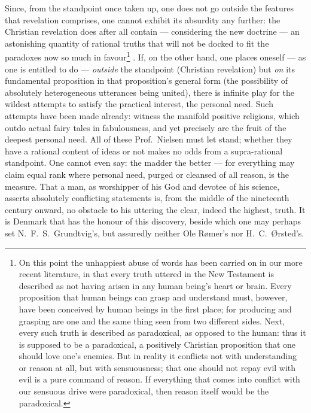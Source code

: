 \documentclass[12pt,a4paper]{book}
\renewcommand{\thefootnote}{*)}
\newcommand{\fnmark}[2]{\renewcommand{\thefootnote}{#1}\footnote{#2}%
  \renewcommand{\thefootnote}{*)}}
\newcommand{\opage}[1]{\marginnote{\footnotesize\textit{[#1]}}}
\begin{document}
Since, from the standpoint once taken up, one does not go outside the features
that revelation comprises,
\opage{35}one cannot exhibit its absurdity any further: the Christian
revelation does after all contain --- considering the new doctrine --- an
astonishing quantity of rational truths that will not be docked to fit the
paradoxes now so much in favour\fnmark{*)}{On this point the unhappiest abuse of
words has been carried on in our more recent literature, in that every truth
uttered in the New Testament is described as not having arisen in any human
being's heart or brain. Every proposition that human beings can grasp and
understand must, however, have been conceived by human beings in the first
place; for producing and grasping are one and the same thing seen from two
different sides. Next, every such truth is described as paradoxical, as opposed
to the human: thus it is supposed to be a paradoxical, a positively Christian
proposition that one should love one's enemies. But in reality it conflicts not
with understanding or reason at all, but with sensuousness; that one should not
repay evil with evil is a pure command of reason. If everything that comes into
conflict with our sensuous drive were paradoxical, then reason itself would be
the paradoxical.}. If, on the other hand, one places oneself --- as one is
entitled to do --- \emph{outside} the standpoint (Christian revelation) but
\emph{on} its fundamental proposition in that proposition's general form (the
possibility of absolutely heterogeneous utterances being united), there is
infinite play for the wildest attempts to satisfy the practical interest, the
personal need. Such attempts have been made already: witness the manifold
positive religions, which outdo actual fairy tales in fabulousness, and yet
precisely
\opage{36}are the fruit of the deepest personal need. All of these Prof.\
Nielsen must let stand; whether they have a rational content of ideas or not
makes no odds from a supra-rational standpoint. One cannot even say: the madder
the better --- for everything may claim equal rank where personal need, purged
or cleansed of all reason, is the measure. That a man, as worshipper of his God
and devotee of his science, asserts absolutely conflicting statements is, from
the middle of the nineteenth century onward, no obstacle to his uttering the
clear, indeed the highest, truth. It is Denmark that has the honour of this
discovery, beside which one may perhaps set N.\ F.\ S.\ Grundtvig's, but
assuredly neither Ole Rømer's nor H.\ C.\ Ørsted's.
\end{document}
